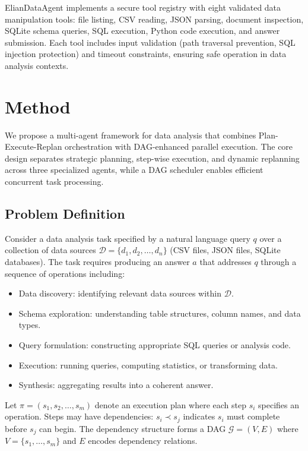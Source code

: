 \documentclass{article}
\theoremstyle{definition}
\begin{document}
ElianDataAgent implements a secure tool registry with eight validated data manipulation tools: file listing, CSV reading, JSON parsing, document inspection, SQLite schema queries, SQL execution, Python code execution, and answer submission. Each tool includes input validation (path traversal prevention, SQL injection protection) and timeout constraints, ensuring safe operation in data analysis contexts.


\section{Method}

We propose a multi-agent framework for data analysis that combines Plan-Execute-Replan orchestration with DAG-enhanced parallel execution. The core design separates strategic planning, step-wise execution, and dynamic replanning across three specialized agents, while a DAG scheduler enables efficient concurrent task processing.

\subsection{Problem Definition}

Consider a data analysis task specified by a natural language query $q$ over a collection of data sources $\mathcal{D} = \{d_1, d_2, \dots, d_n\}$ (CSV files, JSON files, SQLite databases). The task requires producing an answer $a$ that addresses $q$ through a sequence of operations including:
\begin{itemize}[leftmargin=1.5em]
    \item Data discovery: identifying relevant data sources within $\mathcal{D}$.
    \item Schema exploration: understanding table structures, column names, and data types.
    \item Query formulation: constructing appropriate SQL queries or analysis code.
    \item Execution: running queries, computing statistics, or transforming data.
    \item Synthesis: aggregating results into a coherent answer.
\end{itemize}

Let $\pi = (s_1, s_2, \dots, s_m)$ denote an execution plan where each step $s_i$ specifies an operation. Steps may have dependencies: $s_i \prec s_j$ indicates $s_i$ must complete before $s_j$ can begin. The dependency structure forms a DAG $\mathcal{G} = (V, E)$ where $V = \{s_1, \dots, s_m\}$ and $E$ encodes dependency relations.
\end{document}
